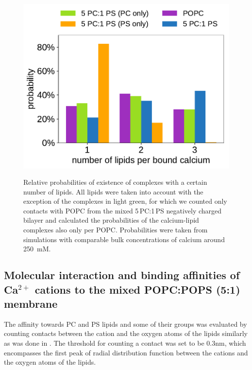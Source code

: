  
\begin{figure}[tb!] 
  \centering 
  \includegraphics[width=\figwidth]{../img/stoichiometry_CaCl2_comparison_Ecc-lipids_PC-vs-PCPS.pdf} \\ 
  \caption{\label{fig:cacl_complexes} 
      Relative probabilities of existence of  complexes 
      with a certain number of lipids.  
      All lipids were taken into account with the exception of the complexes in light green, 
      for which we counted only contacts with POPC from the mixed 5\,PC:1\,PS negatively charged bilayer 
      and calculated the probabilities of the calcium-lipid complexes also only per POPC. 
      Probabilities were taken from simulations with comparable bulk concentrations of calcium around 250~mM. 
  } 
\end{figure} 
 



\subsection{Molecular interaction and binding affinities of Ca$^{2+}$  cations to the mixed POPC:POPS (5:1) membrane} 



The affinity towards PC and PS lipids and some of their groups was evaluated 
by counting contacts between the cation and the oxygen atoms of the lipids
similarly as was done in \cite{melcr18}. 
The threshold for counting a contact was set to be $0.3 \mathrm{nm}$, 
which encompasses the first peak of radial distribution function between the cations and the oxygen atoms of the lipids. 

